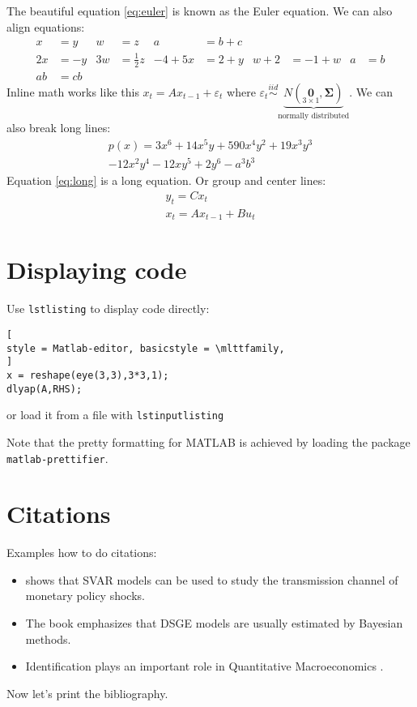 \documentclass[a4paper]{scrartcl}
\begin{document}
The beautiful equation \eqref{eq:euler} is known as the Euler equation. We can also align equations:
\begin{align*}
x&=y           &  w &=z              &  a&=b+c\\
2x&=-y & 3w&=\frac{1}{2}z & -4 + 5x&=2+y & w+2&=-1+w &
a&=b\\
ab&=cb
\end{align*}
Inline math works like this $x_t=A x_{t-1}+ \varepsilon_t$ where $\varepsilon_t \overset{iid}\sim \underbrace{N(\underset{3 \times 1}{\boldsymbol{0}},\boldsymbol{\Sigma})}_{\text{normally distributed}}$.
We can also break long lines:
\begin{multline}
p(x) = 3x^6 + 14x^5y + 590x^4y^2 + 19x^3y^3
\\
- 12x^2y^4 - 12xy^5 + 2y^6 - a^3b^3 \label{eq:long}
\end{multline}
Equation \eqref{eq:long} is a long equation.
Or group and center lines:
\begin{gather*}
y_t = C x_{t}\\
x_t = A x_{t-1} + Bu_t
\end{gather*}

\section{Displaying code}
Use \texttt{lstlisting} to display code directly:
\begin{lstlisting}[
style = Matlab-editor, basicstyle = \mlttfamily,
]
x = reshape(eye(3,3),3*3,1);
dlyap(A,RHS);
\end{lstlisting}
or load it from a file with \texttt{lstinputlisting}

Note that the pretty formatting for MATLAB is achieved by loading the package \texttt{matlab-prettifier}.

\section{Citations}\label{sec:citations}
Examples how to do citations:
\begin{itemize}
  \item \textcite{Sims_1980_MacroeconomicsReality} shows that SVAR models can be used to study the transmission channel of monetary policy shocks.
  \item The book \textcite{Herbst.Schorfheide_2016_BayesianEstimationDSGE} emphasizes that DSGE models are usually estimated by Bayesian methods.
  \item Identification plays an important role in Quantitative Macroeconomics \parencite{Kilian_2013_StructuralVectorAutoregressions,Mutschler_2022_QuantitativeMacroeconomics}.
\end{itemize}
Now let's print the bibliography.
\printbibliography
\end{document}
